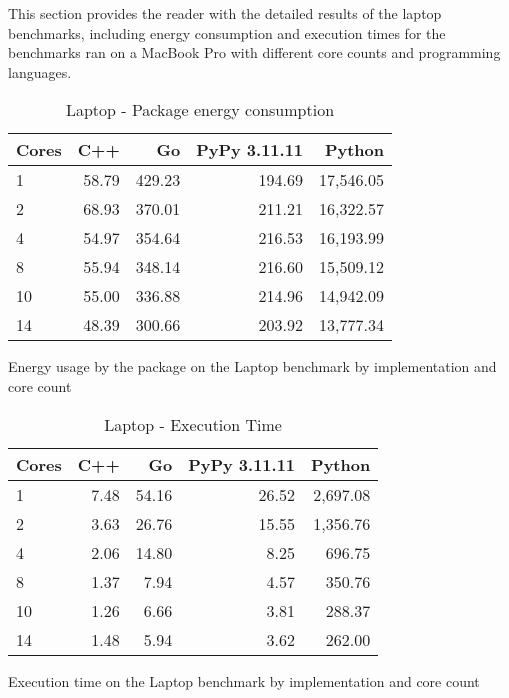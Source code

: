 This section provides the reader with the detailed results of the laptop benchmarks, including energy consumption and execution times for the benchmarks ran on a MacBook Pro with different core counts and programming languages.

\begin{table}[H]
    \centering
    \begin{tabular}{lrrrr}
        \hline
        Cores & C++   & Go       & PyPy 3.11.11 & Python      \\
        \hline
        1     & 58.79  & 429.23  & 194.69       & 17,546.05   \\
        2     & 68.93  & 370.01  & 211.21       & 16,322.57   \\
        4     & 54.97  & 354.64  & 216.53       & 16,193.99   \\
        8     & 55.94  & 348.14  & 216.60       & 15,509.12   \\
        10    & 55.00  & 336.88  & 214.96       & 14,942.09   \\
        14    & 48.39  & 300.66  & 203.92       & 13,777.34   \\
        \hline
    \end{tabular}
\caption{Laptop - Package energy consumption}{Energy usage by the package on the Laptop benchmark by implementation and core count}
\label{tab:mbp-power-consumption}
\end{table}

\begin{table}[H]
    \centering
    \begin{tabular}{lrrrr}
        \hline
        Cores & C++  & Go    & PyPy 3.11.11 & Python    \\
        \hline
        1     & 7.48  & 54.16  & 26.52        & 2,697.08  \\
        2     & 3.63  & 26.76  & 15.55        & 1,356.76  \\
        4     & 2.06  & 14.80  & 8.25         & 696.75    \\
        8     & 1.37  & 7.94   & 4.57         & 350.76    \\
        10    & 1.26  & 6.66   & 3.81         & 288.37    \\
        14    & 1.48  & 5.94   & 3.62         & 262.00    \\
        \hline
    \end{tabular}
\caption{Laptop - Execution Time}{Execution time on the Laptop benchmark by implementation and core count}
\label{tab:mbp-time-execution}
\end{table}


